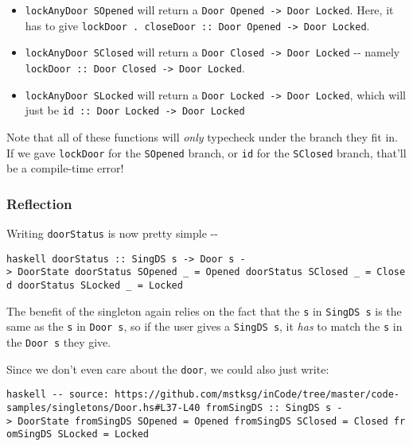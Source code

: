 \documentclass[]{article}
\begin{document}
\begin{itemize}
\item
  \texttt{lockAnyDoor\ SOpened} will return a
  \texttt{Door\ \textquotesingle{}Opened\ -\textgreater{}\ Door\ \textquotesingle{}Locked}.
  Here, it has to give
  \texttt{lockDoor\ .\ closeDoor\ ::\ Door\ \textquotesingle{}Opened\ -\textgreater{}\ Door\ \textquotesingle{}Locked}.
\item
  \texttt{lockAnyDoor\ SClosed} will return a
  \texttt{Door\ \textquotesingle{}Closed\ -\textgreater{}\ Door\ \textquotesingle{}Locked}
  -\/- namely
  \texttt{lockDoor\ ::\ Door\ \textquotesingle{}Closed\ -\textgreater{}\ Door\ \textquotesingle{}Locked}.
\item
  \texttt{lockAnyDoor\ SLocked} will return a
  \texttt{Door\ \textquotesingle{}Locked\ -\textgreater{}\ Door\ \textquotesingle{}Locked},
  which will just be
  \texttt{id\ ::\ Door\ \textquotesingle{}Locked\ -\textgreater{}\ Door\ \textquotesingle{}Locked}
\end{itemize}

Note that all of these functions will \emph{only} typecheck under the branch
they fit in. If we gave \texttt{lockDoor} for the \texttt{SOpened} branch, or
\texttt{id} for the \texttt{SClosed} branch, that'll be a compile-time error!

\subsubsection{Reflection}

Writing \texttt{doorStatus} is now pretty simple -\/-

\texttt{haskell\ doorStatus\ ::\ SingDS\ s\ -\textgreater{}\ Door\ s\ -\textgreater{}\ DoorState\ doorStatus\ SOpened\ \_\ =\ Opened\ doorStatus\ SClosed\ \_\ =\ Closed\ doorStatus\ SLocked\ \_\ =\ Locked}

The benefit of the singleton again relies on the fact that the \texttt{s} in
\texttt{SingDS\ s} is the same as the \texttt{s} in \texttt{Door\ s}, so if the
user gives a \texttt{SingDS\ s}, it \emph{has} to match the \texttt{s} in the
\texttt{Door\ s} they give.

Since we don't even care about the \texttt{door}, we could also just write:

\texttt{haskell\ -\/-\ source:\ https://github.com/mstksg/inCode/tree/master/code-samples/singletons/Door.hs\#L37-L40\ fromSingDS\ ::\ SingDS\ s\ -\textgreater{}\ DoorState\ fromSingDS\ SOpened\ =\ Opened\ fromSingDS\ SClosed\ =\ Closed\ fromSingDS\ SLocked\ =\ Locked}
\end{document}

